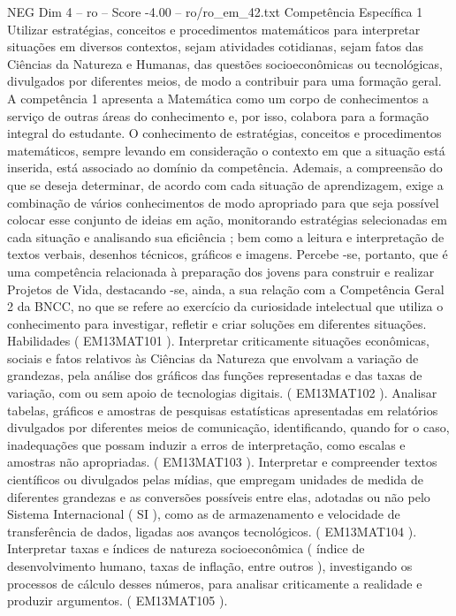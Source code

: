 \begin{textsample}{NEG Dim 4 – ro – Score -4.00 – ro/ro\_em\_42.txt}  \label{ex:f4_neg_071}
Competência Específica 1 Utilizar estratégias, conceitos e procedimentos matemáticos para interpretar situações em diversos contextos, sejam atividades cotidianas, sejam fatos das Ciências da Natureza e Humanas, das questões socioeconômicas ou tecnológicas, divulgados por diferentes meios, de modo a contribuir para uma formação geral.
A competência 1 apresenta a Matemática como um corpo de conhecimentos a serviço de outras áreas do conhecimento e, por isso, colabora para a formação integral do estudante.
O conhecimento de estratégias, conceitos e procedimentos matemáticos, sempre levando em consideração o contexto em que a situação está inserida, está associado ao domínio da competência.
Ademais, a compreensão do que se deseja determinar, de acordo com cada situação de aprendizagem, exige a combinação de vários conhecimentos de modo apropriado para que seja possível colocar esse conjunto de ideias em ação, monitorando estratégias selecionadas em cada situação e analisando sua eficiência ; bem como a leitura e interpretação de textos verbais, desenhos técnicos, gráficos e imagens.
Percebe -se, portanto, que é uma competência relacionada à preparação dos jovens para construir e realizar Projetos de Vida, destacando -se, ainda, a sua relação com a Competência Geral 2 da BNCC, no que se refere ao exercício da curiosidade intelectual que utiliza o conhecimento para investigar, refletir e criar soluções em diferentes situações.
Habilidades ( EM13MAT101 ).
Interpretar criticamente situações econômicas, sociais e fatos relativos às Ciências da Natureza que envolvam a variação de grandezas, pela análise dos gráficos das funções representadas e das taxas de variação, com ou sem apoio de tecnologias digitais. ( EM13MAT102 ).
Analisar tabelas, gráficos e amostras de pesquisas estatísticas apresentadas em relatórios divulgados por diferentes meios de comunicação, identificando, quando for o caso, inadequações que possam induzir a erros de interpretação, como escalas e amostras não apropriadas. ( EM13MAT103 ).
Interpretar e compreender textos científicos ou divulgados pelas mídias, que empregam unidades de medida de diferentes grandezas e as conversões possíveis entre elas, adotadas ou não pelo Sistema Internacional ( SI ), como as de armazenamento e velocidade de transferência de dados, ligadas aos avanços tecnológicos. ( EM13MAT104 ).
Interpretar taxas e índices de natureza socioeconômica ( índice de desenvolvimento humano, taxas de inflação, entre outros ), investigando os processos de cálculo desses números, para analisar criticamente a realidade e produzir argumentos. ( EM13MAT105 ).

\end{textsample}
